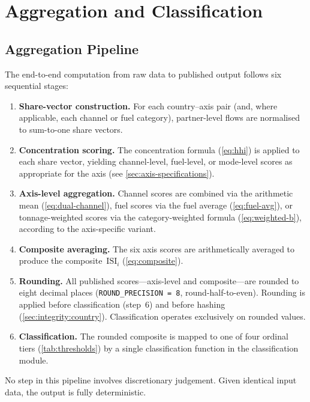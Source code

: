 \section{Aggregation and Classification}\label{sec:aggregation}

\subsection{Aggregation Pipeline}\label{sec:agg:pipeline}

The end-to-end computation from raw data to published output follows six
sequential stages:

\begin{enumerate}
  \item \textbf{Share-vector construction.}  For each country--axis pair (and,
    where applicable, each channel or fuel category), partner-level flows are
    normalised to sum-to-one share vectors.
  \item \textbf{Concentration scoring.}  The concentration formula
    (\cref{eq:hhi}) is applied to each share vector, yielding channel-level,
    fuel-level, or mode-level scores as appropriate for the axis (see
    \cref{sec:axis-specifications}).
  \item \textbf{Axis-level aggregation.}  Channel scores are combined via
    the arithmetic mean (\cref{eq:dual-channel}), fuel scores via the fuel
    average (\cref{eq:fuel-avg}), or tonnage-weighted scores via the
    category-weighted formula (\cref{eq:weighted-b}), according to the
    axis-specific variant.
  \item \textbf{Composite averaging.}  The six axis scores are
    arithmetically averaged to produce the composite~\(\mathrm{ISI}_i\)
    (\cref{eq:composite}).
  \item \textbf{Rounding.}  All published scores---axis-level and
    composite---are rounded to eight decimal places
    (\texttt{ROUND\_PRECISION\,=\,8}, round-half-to-even).  Rounding is
    applied before classification (step~6) and before hashing
    (\cref{sec:integrity:country}).  Classification operates exclusively
    on rounded values.
  \item \textbf{Classification.}  The rounded composite is mapped to one of
    four ordinal tiers (\cref{tab:thresholds}) by a single classification
    function in the classification module.
\end{enumerate}

No step in this pipeline involves discretionary judgement.  Given identical
input data, the output is fully deterministic.

